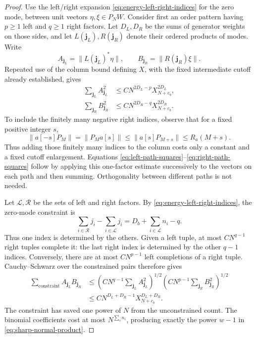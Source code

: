 \begin{proof}
Use the left/right expansion \eqref{eq:energy-left-right-indices} for
the zero mode, between unit vectors $\eta,\xi\in P_NW$.  Consider first
an order pattern having $p\geq1$ left and $q\geq1$ right factors.  Let
$D_L,D_R$ be the sums of generator weights on those sides, and let
$L(\boldsymbol j_L),R(\boldsymbol j_R)$ denote their ordered products
of modes.  Write
\[
 A_{\boldsymbol j_L}=\|L(\boldsymbol j_L)^*\eta\|,
 \qquad
 B_{\boldsymbol j_R}=\|R(\boldsymbol j_R)\xi\|.
\]
Repeated use of the column bound defining $X$, with the fixed
intermediate cutoff already established, gives
\begin{align}
 \sum_{\boldsymbol j_L}A_{\boldsymbol j_L}^2
  &\leq C N^{2D_L-p}X_{N+c_b}^{2D_L},\label{eq:left-path-squares}\\
 \sum_{\boldsymbol j_R}B_{\boldsymbol j_R}^2
  &\leq C N^{2D_R-q}X_{N+c_b}^{2D_R}.
       \label{eq:right-path-squares}
\end{align}
To include the finitely many negative right indices, observe that for a
fixed positive integer $s$,
\[
 \|a[-s]P_M\|=\|P_Ma[s]\|
       \leq\|a[s]P_{M+s}\|\leq R_a(M+s).
\]
Thus adding those finitely many indices to the column costs only a
constant and a fixed cutoff enlargement.  Equations
\eqref{eq:left-path-squares}--\eqref{eq:right-path-squares} follow by
applying this one-factor estimate successively to the vectors on each
path and then summing.  Orthogonality between different paths is not
needed.

Let $\mathcal L,\mathcal R$ be the sets of left and right factors.
By \eqref{eq:energy-left-right-indices}, the zero-mode constraint is
\[
 \sum_{i\in\mathcal R}j_i-\sum_{i\in\mathcal L}j_i
   =D_b+\sum_{i\in\mathcal L}n_i-q.
\]
Thus one index is determined by the others. Given
a left tuple, at most $CN^{q-1}$ right tuples complete it: the last
right index is determined by the other $q-1$ indices.  Conversely,
there are at most $CN^{p-1}$ left completions of a right tuple.
Cauchy--Schwarz over the constrained pairs therefore gives
\begin{align*}
 \sum_{\text{constraint}}
       A_{\boldsymbol j_L}B_{\boldsymbol j_R}
 &\leq
 \left(CN^{q-1}\sum_{\boldsymbol j_L}A_{\boldsymbol j_L}^2\right)^{1/2}
 \left(CN^{p-1}\sum_{\boldsymbol j_R}B_{\boldsymbol j_R}^2\right)^{1/2}\\
 &\leq C N^{D_L+D_R-1}X_{N+c_b}^{D_L+D_R}.
\end{align*}
The constraint has saved one power of $N$ from the unconstrained count.
The binomial coefficients cost at most $N^{\sum_i n_i}$, producing
exactly the power $w-1$ in \eqref{eq:sharp-normal-product}.


\end{proof}
